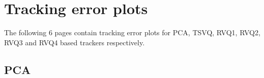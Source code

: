\clearpage
\newpage
\section{Tracking error plots}
\label{App:tracking_error_plots}
The following 6 pages contain tracking error plots for PCA, TSVQ, RVQ1, RVQ2, RVQ3 and RVQ4 based trackers respectively.

\clearpage
\newpage
\subsection{PCA}
\begin{figure}[h!]
\centering
\\

\end{figure}
